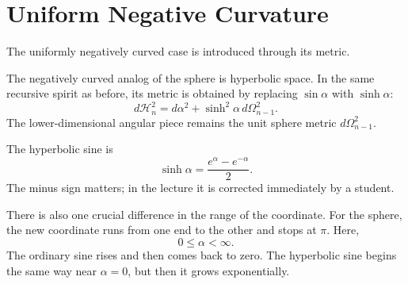 \begin{classroomqa}
\end{classroomqa}

\begin{classroomqa}
\end{classroomqa}

\section{Uniform Negative Curvature}

The uniformly negatively curved case is introduced through its metric.

The negatively curved analog of the sphere is hyperbolic space. In the same recursive spirit as before, its metric is obtained by replacing \(\sin\alpha\) with \(\sinh\alpha\):
\begin{equation}
d\mathcal H_n^2=d\alpha^2+\sinh^2\alpha\,d\Omega_{n-1}^2.
\end{equation}
The lower-dimensional angular piece remains the unit sphere metric \(d\Omega_{n-1}^2\).

\begin{classroomqa}
\end{classroomqa}

The hyperbolic sine is
\begin{equation}
\sinh\alpha=\frac{e^\alpha-e^{-\alpha}}{2}.
\end{equation}
The minus sign matters; in the lecture it is corrected immediately by a student.

There is also one crucial difference in the range of the coordinate. For the sphere, the new coordinate runs from one end to the other and stops at \(\pi\). Here,
\begin{equation}
0\leq \alpha<\infty.
\end{equation}
The ordinary sine rises and then comes back to zero. The hyperbolic sine begins the same way near \(\alpha=0\), but then it grows exponentially.

